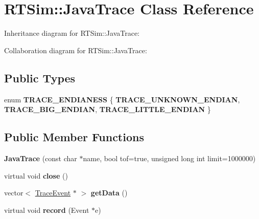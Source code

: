 \hypertarget{classRTSim_1_1JavaTrace}{}\section{R\+T\+Sim\+:\+:Java\+Trace Class Reference}
\label{classRTSim_1_1JavaTrace}


Inheritance diagram for R\+T\+Sim\+:\+:Java\+Trace\+:


Collaboration diagram for R\+T\+Sim\+:\+:Java\+Trace\+:
\subsection*{Public Types}
\begin{DoxyCompactItemize}
\item 
enum {\bfseries T\+R\+A\+C\+E\+\_\+\+E\+N\+D\+I\+A\+N\+E\+SS} \{ {\bfseries T\+R\+A\+C\+E\+\_\+\+U\+N\+K\+N\+O\+W\+N\+\_\+\+E\+N\+D\+I\+AN}, 
{\bfseries T\+R\+A\+C\+E\+\_\+\+B\+I\+G\+\_\+\+E\+N\+D\+I\+AN}, 
{\bfseries T\+R\+A\+C\+E\+\_\+\+L\+I\+T\+T\+L\+E\+\_\+\+E\+N\+D\+I\+AN}
 \}\hypertarget{classRTSim_1_1JavaTrace_aef738e04abe677ba1bf155204828bbd2}{}\label{classRTSim_1_1JavaTrace_aef738e04abe677ba1bf155204828bbd2}

\end{DoxyCompactItemize}
\subsection*{Public Member Functions}
\begin{DoxyCompactItemize}
\item 
{\bfseries Java\+Trace} (const char $\ast$name, bool tof=true, unsigned long int limit=1000000)\hypertarget{classRTSim_1_1JavaTrace_afb4db6d18f0f967123f30de6c405f58a}{}\label{classRTSim_1_1JavaTrace_afb4db6d18f0f967123f30de6c405f58a}

\item 
virtual void {\bfseries close} ()\hypertarget{classRTSim_1_1JavaTrace_ac53823bc4866f29216ccc65be6d0e916}{}\label{classRTSim_1_1JavaTrace_ac53823bc4866f29216ccc65be6d0e916}

\item 
vector$<$ \hyperlink{classRTSim_1_1TraceEvent}{Trace\+Event} $\ast$ $>$ {\bfseries get\+Data} ()\hypertarget{classRTSim_1_1JavaTrace_af2504d5d2b9de4c00997e5e0af1882f0}{}\label{classRTSim_1_1JavaTrace_af2504d5d2b9de4c00997e5e0af1882f0}

\item 
virtual void {\bfseries record} (Event $\ast$e)\hypertarget{classRTSim_1_1JavaTrace_a9a69d2ae6a25d9a4e62ac8f1924953e2}{}\label{classRTSim_1_1JavaTrace_a9a69d2ae6a25d9a4e62ac8f1924953e2}

\end{DoxyCompactItemize}
